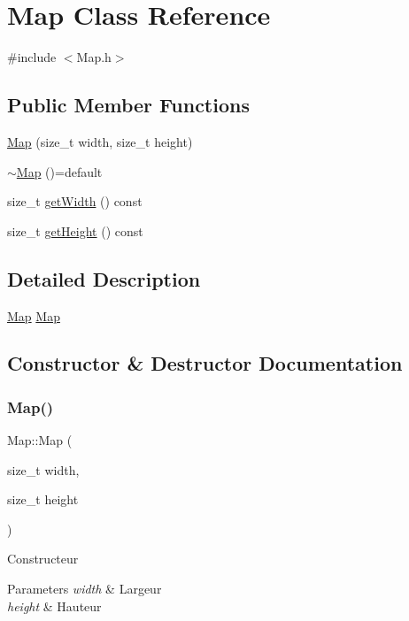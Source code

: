 \hypertarget{classMap}{}\section{Map Class Reference}
\label{classMap}


{\ttfamily \#include $<$Map.\+h$>$}

\subsection*{Public Member Functions}
\begin{DoxyCompactItemize}
\item 
\hyperlink{classMap_a4685416c762bcce66e5e09b60b612246}{Map} (size\+\_\+t width, size\+\_\+t height)
\item 
\hyperlink{classMap_ac994171254714ad2e8161f995b70e499}{$\sim$\+Map} ()=default
\item 
size\+\_\+t \hyperlink{classMap_ad39fb3144a47c8e7e6256ecde71928c0}{get\+Width} () const
\item 
size\+\_\+t \hyperlink{classMap_a5ad6ea0107aefd0aba86b6d1053a1e97}{get\+Height} () const
\end{DoxyCompactItemize}


\subsection{Detailed Description}
\hyperlink{classMap}{Map} \hyperlink{classMap}{Map} 

\subsection{Constructor \& Destructor Documentation}
\mbox{\label{classMap_a4685416c762bcce66e5e09b60b612246}} 
\subsubsection{\texorpdfstring{Map()}{Map()}}
{\footnotesize\ttfamily Map\+::\+Map (\begin{DoxyParamCaption}\item[{size\+\_\+t}]{width,  }\item[{size\+\_\+t}]{height }\end{DoxyParamCaption})}

Constructeur 
\begin{DoxyParams}{Parameters}
{\em width} & Largeur \\
\hline
{\em height} & Hauteur \\
\hline
\end{DoxyParams}
\mbox{\label{classMap_ac994171254714ad2e8161f995b70e499}} 
